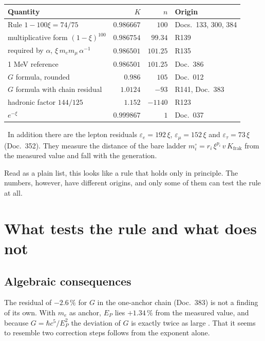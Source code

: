 \begin{center}
\begin{tabular}{@{}lrrl@{}}
\toprule
\textbf{Quantity} & \textbf{$K$} & \textbf{$n$} & \textbf{Origin}\\
\midrule
Rule $1-100\xi=74/75$ & $0.986667$ & $100$ & Docs.~133, 300, 384\\
multiplicative form $(1-\xi)^{100}$ & $0.986754$ & $99.34$ & R139\\
required by $\alpha$, $\xi\,m_em_\mu\,\alpha^{-1}$ & $0.986501$ & $101.25$ & R135\\
1 MeV reference & $0.986501$ & $101.25$ & Doc.~386\\
$G$ formula, rounded & $0.986$ & $105$ & Doc.~012\\
$G$ formula with chain residual & $1.0124$ & $-93$ & R141, Doc.~383\\
hadronic factor $144/125$ & $1.152$ & $-1140$ & R123\\
$e^{-\xi}$ & $0.999867$ & $1$ & Doc.~037\\
\bottomrule
\end{tabular}
\end{center}
\KM\ In addition there are the lepton residuals $\varepsilon_e=192\,\xi$, $\varepsilon_\mu=152\,\xi$
and $\varepsilon_\tau=73\,\xi$ (Doc.~352). They measure the distance of the bare ladder
$m_i^\circ=r_i\,\xi^{p_i}\,v\,K_{\text{frak}}$ from the measured value and fall with the generation.

Read as a plain list, this looks like a rule that holds only in principle. The numbers, however,
have different origins, and only some of them can test the rule at all.

\section{What tests the rule and what does not}

\subsection{Algebraic consequences}

The residual of $-2.6\,\%$ for $G$ in the one-anchor chain (Doc.~383) is not a finding of its own.
With $m_e$ as anchor, $E_P$ lies $+1.34\,\%$ from the measured value, and because $G=\hbar
c^5/E_P^2$ the deviation of $G$ is exactly twice as large \BM. That it seems to resemble two
correction steps follows from the exponent alone.

